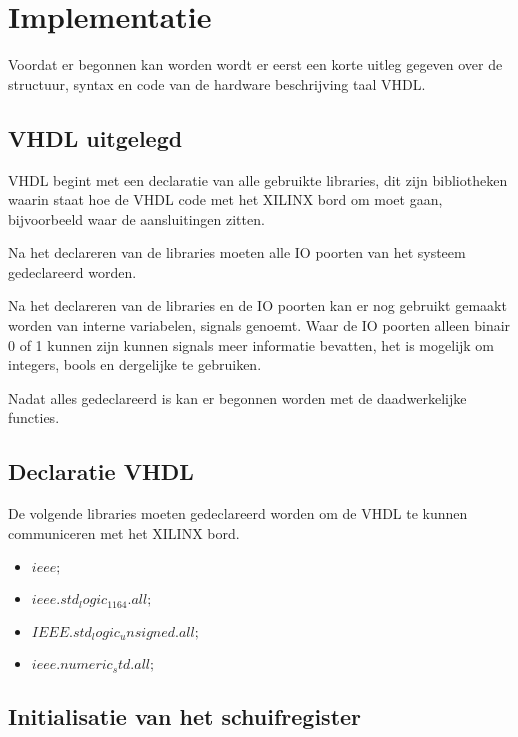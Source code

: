 \chapter{Implementatie}

Voordat er begonnen kan worden wordt er eerst een korte uitleg gegeven over de structuur, syntax en code van de hardware beschrijving taal VHDL.

\section{VHDL uitgelegd}

VHDL begint met een declaratie van alle gebruikte libraries, dit zijn bibliotheken waarin staat hoe de VHDL code met het XILINX bord om moet gaan, bijvoorbeeld waar de aansluitingen zitten.

Na het declareren van de libraries moeten alle IO poorten van het systeem gedeclareerd worden.

Na het declareren van de libraries en de IO poorten kan er nog gebruikt gemaakt worden van interne variabelen, signals genoemt. Waar de IO poorten alleen binair 0 of 1 kunnen zijn kunnen signals meer informatie bevatten, het is mogelijk om integers, bools en dergelijke te gebruiken.

Nadat alles gedeclareerd is kan er begonnen worden met de daadwerkelijke functies.

\clearpage
\section{Declaratie VHDL}

De volgende libraries moeten gedeclareerd worden om de VHDL te kunnen communiceren met het XILINX bord.

\begin{itemize}
	\item $ieee;$
	\item $ieee.std_logic_1164.all;$
	\item $IEEE.std_logic_unsigned.all;$
	\item $ieee.numeric_std.all;$
\end{itemize}
\section{Initialisatie van het schuifregister}

